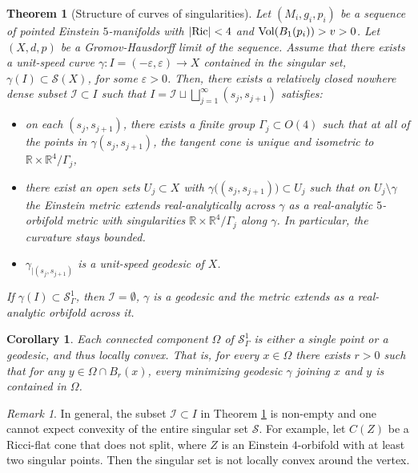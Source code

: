 \documentclass[11pt,reqno]{amsart}
\numberwithin{equation}{section}
\newcommand{\Ric}{{\rm Ric}}
\newcommand{\Vol}{{\rm Vol}}
\newcommand{\cI}{\mathcal{I}}
\newcommand{\cS}{\mathcal{S}}
\newtheorem{theorem}[thm]{Theorem}
\newtheorem{corollary}[thm]{Corollary}
\theoremstyle{definition}
\theoremstyle{remark}
\newtheorem{remark}[thm]{Remark}
\begin{document}
\begin{theorem}[Structure of curves of singularities]\label{mthm: orbifold regularity} 
Let $(M_i,g_i,p_i)$ be a sequence of pointed \emph{Einstein} $5$-manifolds with $|\Ric|<4$ and $\Vol(B_1(p_i))>v>0$. Let $(X,d,p)$ be a Gromov-Hausdorff limit of the sequence. Assume that there exists a unit-speed curve $\gamma:I = (-\varepsilon,\varepsilon)\to X$ contained in the singular set, $\gamma(I)\subset\mathcal{S}(X)$, for some $\varepsilon>0$. Then, there exists a relatively closed \emph{nowhere dense} subset $\cI \subset I$ such that $I = \cI \sqcup \bigsqcup_{j =1}^{\infty} (s_j, s_{j+1})$ satisfies:
\begin{itemize}
    \item on each $(s_j,s_{j+1})$, there exists a finite group $\Gamma_j\subset O(4)$ such that at all of the points in $\gamma(s_j,s_{j+1})$, the tangent cone  is unique and isometric to $\mathbb{R}\times \mathbb{R}^4/\Gamma_j$,
    \item there exist an open sets $U_j\subset X$ with $\gamma\big((s_j,s_{j+1})\big)\subset U_j$ such that on $U_j\setminus\gamma$ the Einstein metric extends \emph{real-analytically} across $\gamma$ as a real-analytic $5$-orbifold metric with singularities $\mathbb{R}\times \mathbb{R}^4/\Gamma_j$ along $\gamma$. In particular, the curvature stays bounded.
    \item $\gamma_{|(s_j,s_{j+1})}$ is a unit-speed geodesic of $X$. 
\end{itemize}
If $\gamma(I)\subset\mathcal{S}^1_\Gamma$, then $\cI=\emptyset$, $\gamma$ is a geodesic and the metric extends as a real-analytic orbifold across it.
\end{theorem}


\begin{corollary}
    Each connected component $\Omega$ of $\cS^1_{\Gamma}$ is either a single point or a geodesic, and thus \emph{locally convex}. That is, for every $x\in \Omega$ there exists $r>0$ such that for any $y\in \Omega\cap B_{r}(x)$, every minimizing geodesic $\gamma$ joining $x$ and $y$ is contained in $\Omega$.
\end{corollary}


\begin{remark}
    In general, the subset $\cI \subset I$ in Theorem \ref{mthm: orbifold regularity} is non-empty and one cannot expect convexity of the entire singular set $\cS$. For example, let $C(Z)$ be a Ricci-flat cone that does not split, where $Z$ is an Einstein $4$-orbifold with at least two singular points. Then the singular set is not locally convex around the vertex. 
\end{remark}
\end{document}
